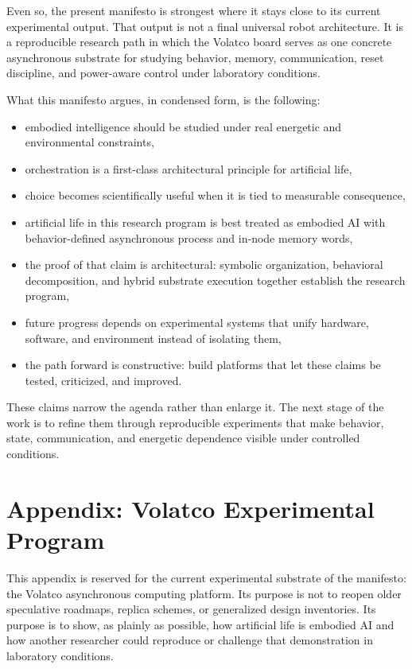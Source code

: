 \documentclass[a4paper,english]{article}
\begin{document}
Even so, the present manifesto is strongest where it stays close to
its current experimental output. That output is not a final universal
robot architecture. It is a reproducible research path in which the
Volatco board serves as one concrete asynchronous substrate for studying
behavior, memory, communication, reset discipline, and power-aware
control under laboratory conditions.

What this manifesto argues, in condensed form, is the following:
\begin{itemize}
\item embodied intelligence should be studied under real energetic and environmental
constraints,
\item orchestration is a first-class architectural principle for artificial
life,
\item choice becomes scientifically useful when it is tied to measurable
consequence,
\item artificial life in this research program is best treated as embodied
AI with behavior-defined asynchronous process and in-node memory words,
\item the proof of that claim is architectural: symbolic organization, behavioral
decomposition, and hybrid substrate execution together establish the
research program,
\item future progress depends on experimental systems that unify hardware,
software, and environment instead of isolating them,
\item the path forward is constructive: build platforms that let these claims
be tested, criticized, and improved.
\end{itemize}

These claims narrow the agenda rather than enlarge it. The next stage
of the work is to refine them through reproducible experiments
that make behavior, state, communication, and energetic dependence
visible under controlled conditions.

\section{Appendix: Volatco Experimental Program}

This appendix is reserved for the current experimental substrate of
the manifesto: the Volatco asynchronous computing platform. Its purpose
is not to reopen older speculative roadmaps, replica schemes, or generalized
design inventories. Its purpose is to show, as plainly as possible,
how artificial life is embodied AI and how another researcher could
reproduce or challenge that demonstration in laboratory conditions.
\end{document}
